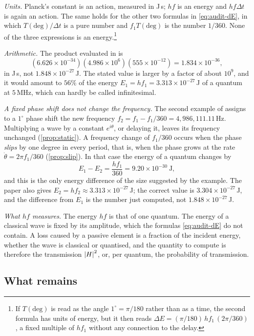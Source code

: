 \emph{Units.} Planck's constant is an action, measured in J\,s; $hf$ is an
energy and $hf\Delta t$ is again an action. The same holds for the other two
formulas in \eqref{eq:audit-dE}, in which $T(\mathrm{deg})/\Delta t$ is a pure
number and $f_1T(\mathrm{deg})$ is the number $1/360$. None of the three
expressions is an energy.\footnote{If $T(\mathrm{deg})$ is read as the angle
$1^\circ=\pi/180$ rather than as a time, the second formula has units of
energy, but it then reads $\Delta E=(\pi/180)\,hf_1\,(2\pi/360)$, a fixed
multiple of $hf_1$ without any connection to the delay.}

\emph{Arithmetic.} The product evaluated in \cite{tb23} is
\[
(6.626\times10^{-34})(4.986\times10^{6})(555\times10^{-12})
=1.834\times10^{-36},
\]
in J\,s, not $1.848\times10^{-27}$\,J. The stated value is larger by a factor
of about $10^{9}$, and it would amount to $56\%$ of the energy
$E_1=hf_1=3.313\times10^{-27}$\,J of a quantum at $5$\,MHz, which can hardly
be called infinitesimal.

\emph{A fixed phase shift does not change the frequency.} The second example
of \cite{tb23} assigns to a $1^\circ$ phase shift the new frequency
$f_2=f_1-f_1/360=4{,}986{,}111.11$\,Hz. Multiplying a wave by a constant
$e^{i\theta}$, or delaying it, leaves its frequency unchanged
(\cref{prop:static}). A frequency change of $f_1/360$ occurs when the phase
\emph{slips} by one degree in every period, that is, when the phase grows
at the rate $\dot\theta=2\pi f_1/360$ (\cref{prop:slip}). In that case the
energy of a quantum changes by
\[
E_1-E_2=\frac{hf_1}{360}=9.20\times10^{-30}\ \mathrm J ,
\]
and this is the only energy difference of the size suggested by the example.
The paper also gives $E_2=hf_2\approx3.313\times10^{-27}$\,J; the correct
value is $3.304\times10^{-27}$\,J, and the difference from $E_1$ is the number
just computed, not $1.848\times10^{-27}$\,J.

\emph{What $hf$ measures.} The energy $hf$ is that of one quantum. The energy
of a classical wave is fixed by its amplitude, which the formulas
\eqref{eq:audit-dE} do not contain. A loss caused by a passive element is a
fraction of the incident energy, whether the wave is classical or quantised,
and the quantity to compute is therefore the transmission $\left|H\right|^2$, or,
per quantum, the probability of transmission.

\subsection{What remains}

